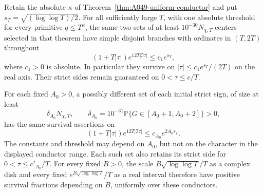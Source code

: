 \begin{corollary}
\label{cor:A049-uniform-anisotropic}
Retain the absolute $\kappa$ of
Theorem~\ref{thm:A049-uniform-conductor} and put
$s_T=\sqrt{(\log\log T)/2}$.
For all sufficiently large $T$, with one absolute threshold
for every primitive $q\le T^\kappa$, the same two sets of at least
$10^{-30}N_{\chi,T}$ centers selected in that theorem
have simple disjoint branches with ordinates in $(T,2T)$
throughout
\[
 (1+T|\tau|)e^{12T|\Im\tau|}\le c_1e^{s_T},
\tag{A049u.26}
\]
where $c_1>0$ is absolute. In particular they survive on
$|\tau|\le c_1e^{s_T}/(2T)$ on the real axis.
Their strict sides remain guaranteed on $0<\tau\le c/T$.

For each fixed $A_0>0$, a possibly different set of each
initial strict sign, of size at least
\[
 \delta_{A_0}N_{\chi,T},\qquad
 \delta_{A_0}=10^{-31}\mathbb P\{G\in[A_0+1,A_0+2]\}>0,
\]
has the same survival assertions on
\[
 (1+T|\tau|)e^{12T|\Im\tau|}
                     \le c_{A_0}e^{2A_0s_T}.
\tag{A049u.27}
\]
The constants and threshold may depend on $A_0$, but
not on the character in the displayed conductor range.
Each such set also retains its strict side for
$0<\tau\le c'_{A_0}/T$. For every fixed $B>0$, the scale
$B\sqrt{\log\log T}/T$ as a complex disk and every
fixed $e^{B\sqrt{\log\log T}}/T$ as a real interval
therefore have positive survival fractions depending
on $B$, uniformly over these conductors.
\end{corollary}

